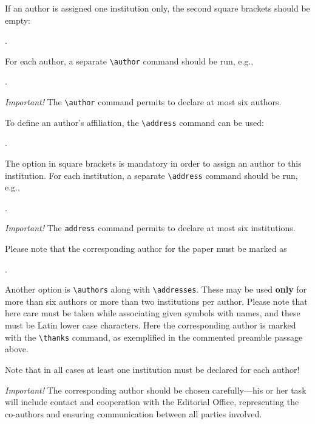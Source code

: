 \documentclass{amcs}
\begin{document}
\medskip\noindent
If an author is assigned one institution only, the second square brackets should be empty:

\medskip
{}.

\medskip\noindent
For each author, a separate \verb+\author+ command should be run, e.g.,

\medskip
{}
.

\medskip\noindent
\emph{Important!} The \verb+\author+ command permits to declare at most six authors.

To define an author's affiliation, the \verb+\address+ command can be used:

\medskip
{}.

\medskip\noindent
The option in square brackets is mandatory in order to assign an author to this institution. For each institution, a separate \verb+\address+ command should be run, e.g.,

\medskip
{}
.

\medskip\noindent
\emph{Important!} The \verb+address+ command permits to declare at most six institutions.

Please note that the corresponding author for the paper must be marked as

\medskip
{}.

\medskip\noindent
Another option is \verb+\authors+ along with  \verb+\addresses+. These may be used \textbf{only} for more than six authors or more than two institutions per author. Please note that here care must be taken while associating given symbols with names, and these must be Latin lower case characters. Here the corresponding author is marked with the \verb+\thanks+ command, as exemplified in the commented preamble passage above.

Note that in all cases at least one institution must be declared for each author!

\medskip\noindent
\emph{Important!} The corresponding author should be chosen carefully---his or her task will include contact and cooperation with the Editorial Office, representing the co-authors and ensuring communication between all parties involved.
\end{document}

